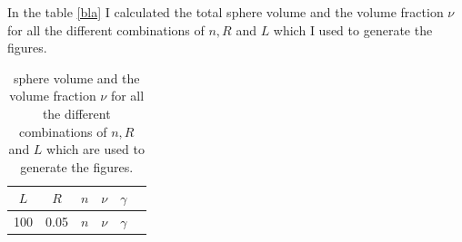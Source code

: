 \documentclass[a4paper,10pt]{article}
\begin{document}
In the table \ref{bla} I calculated the total sphere volume and the volume fraction $\nu$ for all the different combinations of $n,R$ and $L$ which I used to generate the figures.


\begin{table}
  \begin{tabular}{|c|c|c|c|c|c|}
  \hline
   $L$& $R$&$n$&$\nu$&$\gamma$ \\ \hline
   \multirow{3}{*}{100} & \multirow{3}{*}{0.05} &$n$&$\nu$&$\gamma$ \\ \hline
  
  \end{tabular}
  \caption{ sphere volume and the volume fraction $\nu$ for all the different combinations of $n,R$ and $L$ which are used to generate the figures.}
  \label{tabel1}
\end{table}
\end{document}
